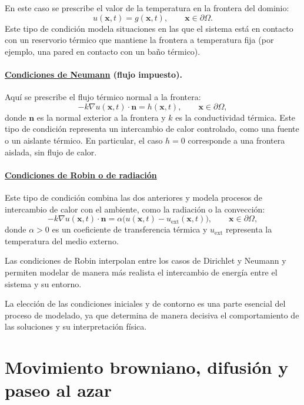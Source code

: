 \documentclass[12pt, a4paper]{amsbook}
\newcommand{\n}{{\mathbf n}}
\newcommand{\xx}{{\mathbf x}}
\theoremstyle{remark}
\theoremstyle{definition}
\numberwithin{section}{chapter}
\numberwithin{subsection}{section}
\numberwithin{equation}{section}
\numberwithin{figure}{chapter}
\begin{document}
En este caso se prescribe el valor de la temperatura en la frontera del dominio:
$$
u(\xx,t) = g(\xx,t), \qquad \xx \in \partial \Omega.
$$
Este tipo de condición modela situaciones en las que el sistema está en contacto con un reservorio térmico que mantiene la frontera a temperatura fija (por ejemplo, una pared en contacto con un baño térmico).

\paragraph{\underline{Condiciones de Neumann} (flujo impuesto).}

Aquí se prescribe el flujo térmico normal a la frontera:
$$
- k \nabla u(\xx,t)\cdot \n = h(\xx,t), \qquad \xx \in \partial \Omega,
$$
donde $\n$ es la normal exterior a la frontera y $k$ es la conductividad térmica. Este tipo de condición representa un intercambio de calor controlado, como una fuente o un aislante térmico. En particular, el caso $h=0$ corresponde a una frontera aislada, sin flujo de calor.

\paragraph{\underline{Condiciones de Robin o de radiación}}

Este tipo de condición combina las dos anteriores y modela procesos de intercambio de calor con el ambiente, como la radiación o la convección:
$$
- k \nabla u(\xx,t)\cdot \n = \alpha \bigl(u(\xx,t) - u_{\text{ext}}(\xx,t)\bigr), \qquad \xx \in \partial \Omega,
$$
donde $\alpha>0$ es un coeficiente de transferencia térmica y $u_{\text{ext}}$ representa la temperatura del medio externo.

Las condiciones de Robin interpolan entre los casos de Dirichlet y Neumann y permiten modelar de manera más realista el intercambio de energía entre el sistema y su entorno.

\medskip

La elección de las condiciones iniciales y de contorno es una parte esencial del proceso de modelado, ya que determina de manera decisiva el comportamiento de las soluciones y su interpretación física.

\section{Movimiento browniano, difusión y paseo al azar}
\end{document}
